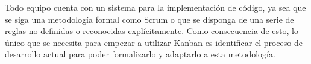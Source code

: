 
Todo equipo cuenta con un sistema para la implementación de código, ya sea que
se siga una metodología formal como Scrum o que se disponga de una serie de
reglas no definidas o reconocidas explícitamente. Como consecuencia de esto, lo
único que se necesita para empezar a utilizar Kanban es identificar el proceso
de desarrollo actual para poder formalizarlo y adaptarlo a esta metodología.


